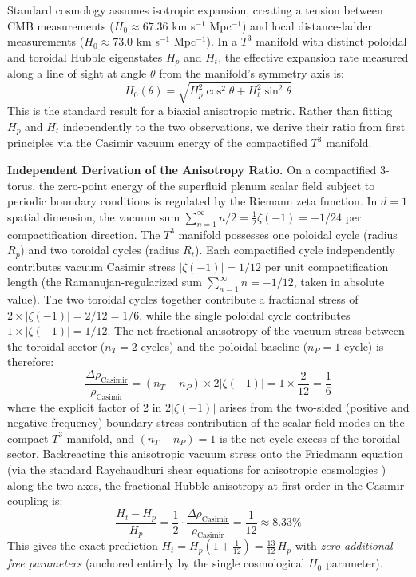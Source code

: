\documentclass[aps,prd,10pt,twocolumn,superscriptaddress,nofootinbib,floatfix]{revtex4-2}
\begin{document}
Standard cosmology assumes isotropic expansion, creating a tension between CMB measurements ($H_0 \approx 67.36$ km s$^{-1}$ Mpc$^{-1}$) and local distance-ladder measurements ($H_0 \approx 73.0$ km s$^{-1}$ Mpc$^{-1}$). In a $T^3$ manifold with distinct poloidal and toroidal Hubble eigenstates $H_p$ and $H_t$, the effective expansion rate measured along a line of sight at angle $\theta$ from the manifold's symmetry axis is:
\begin{equation}
H_0(\theta) = \sqrt{H_p^2\cos^2\theta + H_t^2\sin^2\theta}
\end{equation}
This is the standard result for a biaxial anisotropic metric. Rather than fitting $H_p$ and $H_t$ independently to the two observations, we derive their ratio from first principles via the Casimir vacuum energy of the compactified $T^3$ manifold.

\textbf{Independent Derivation of the Anisotropy Ratio.} On a compactified 3-torus, the zero-point energy of the superfluid plenum scalar field subject to periodic boundary conditions is regulated by the Riemann zeta function. In $d=1$ spatial dimension, the vacuum sum $\sum_{n=1}^\infty n/2 = \frac{1}{2}\zeta(-1) = -1/24$ per compactification direction. The $T^3$ manifold possesses one poloidal cycle (radius $R_p$) and two toroidal cycles (radius $R_t$). Each compactified cycle independently contributes vacuum Casimir stress $|\zeta(-1)| = 1/12$ per unit compactification length (the Ramanujan-regularized sum $\sum_{n=1}^\infty n = -1/12$, taken in absolute value). The two toroidal cycles together contribute a fractional stress of $2 \times |\zeta(-1)| = 2/12 = 1/6$, while the single poloidal cycle contributes $1 \times |\zeta(-1)| = 1/12$. The net fractional anisotropy of the vacuum stress between the toroidal sector ($n_T = 2$ cycles) and the poloidal baseline ($n_P = 1$ cycle) is therefore:
\begin{equation}
\frac{\Delta \rho_{\text{Casimir}}}{\rho_{\text{Casimir}}} = (n_T - n_P) \times 2\left|\zeta(-1)\right| = 1 \times \frac{2}{12} = \frac{1}{6}
\end{equation}
where the explicit factor of 2 in $2|\zeta(-1)|$ arises from the two-sided (positive and negative frequency) boundary stress contribution of the scalar field modes on the compact $T^3$ manifold, and $(n_T - n_P) = 1$ is the net cycle excess of the toroidal sector.
Backreacting this anisotropic vacuum stress onto the Friedmann equation (via the standard Raychaudhuri shear equations for anisotropic cosmologies \cite{jacobson_einstein}) along the two axes, the fractional Hubble anisotropy at first order in the Casimir coupling is:
\begin{equation}\label{eq:casimir_ratio}
\frac{H_t - H_p}{H_p} = \frac{1}{2} \cdot \frac{\Delta \rho_{\text{Casimir}}}{\rho_{\text{Casimir}}} = \frac{1}{12} \approx 8.33\%
\end{equation}
This gives the exact prediction $H_t = H_p\left(1 + \frac{1}{12}\right) = \frac{13}{12}\,H_p$ with \emph{zero additional free parameters} (anchored entirely by the single cosmological $H_0$ parameter).
\end{document}
